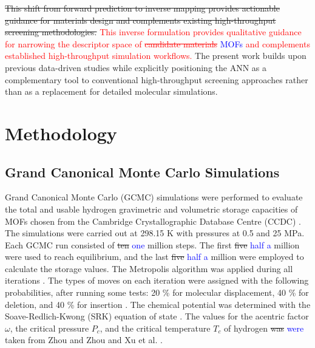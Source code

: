 \documentclass[review]{elsarticle}
\begin{document}
\sout{This shift from forward prediction to inverse mapping provides actionable 
guidance for materials design and complements existing high-throughput 
screening methodologies.} \textcolor{red}{This inverse formulation provides 
qualitative guidance for narrowing the descriptor space of \sout{candidate 
materials} \textcolor{blue}{MOFs} and complements established high-throughput 
simulation workflows.} The present work builds upon previous data-driven 
studies while explicitly positioning the ANN as a complementary tool to 
conventional high-throughput screening approaches rather than as a replacement 
for detailed molecular simulations. 



\section{Methodology}

\subsection{Grand Canonical Monte Carlo Simulations}

Grand Canonical Monte Carlo (GCMC) simulations were performed to evaluate 
the total and usable hydrogen gravimetric and volumetric storage capacities 
of MOFs chosen from the Cambridge Crystallographic Database Centre (CCDC) 
\cite{ccdc}. The simulations were carried out at 298.15 K with pressures at 
0.5 and 25 MPa. Each GCMC run consisted of \sout{ten} \textcolor{blue}{one} 
million steps. The first \sout{five} \textcolor{blue}{half a} million were 
used to reach equilibrium, and the last 
\sout{five} \textcolor{blue}{half a} million 
were employed to calculate the storage values. The Metropolis algorithm was 
applied during all iterations \cite{metropolis87}. The types of moves on 
each iteration were assigned with the following probabilities, after running 
some tests: 20 \% for molecular displacement, 40 \% for deletion, and 40 \% 
for insertion \cite{cc22,gc24,gc24a}. The chemical potential was determined 
with the Soave-Redlich-Kwong (SRK) equation of state \cite{soave72}. The 
values for the acentric factor $\omega$, the critical pressure $P_c$, and 
the critical temperature $T_c$ of hydrogen \sout{was} \textcolor{blue}{were} 
taken from Zhou and Zhou \cite{zz01} and Xu et al. \cite{xdy12}. 
 
\end{document}
